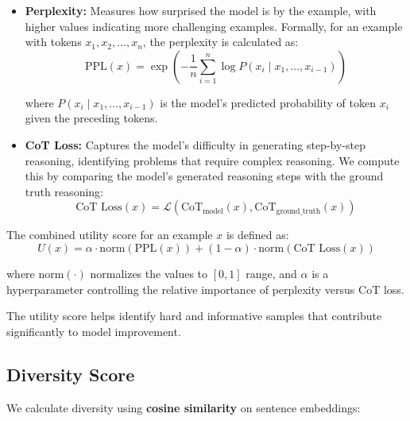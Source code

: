 \documentclass{article}
\begin{document}
\begin{itemize}
    \item \textbf{Perplexity:} Measures how surprised the model is by the example, with higher values indicating more challenging examples. Formally, for an example with tokens $x_1, x_2, \ldots, x_n$, the perplexity is calculated as:
    \begin{equation}\label{eq:5.1}
        \text{PPL}(x) = \exp\left(-\frac{1}{n} \sum_{i=1}^{n} \log P(x_i \mid x_1, \ldots, x_{i-1}) \right)
    \end{equation}
    
    where $P(x_i \mid x_1, \ldots, x_{i-1})$ is the model's predicted probability of token $x_i$ given the preceding tokens.
   
    \item \textbf{CoT Loss:} Captures the model's difficulty in generating step-by-step reasoning, identifying problems that require complex reasoning. We compute this by comparing the model's generated reasoning steps with the ground truth reasoning:
    \begin{equation}\label{eq:5.2}
    \text{CoT Loss}(x) = \mathcal{L}(\text{CoT}_{\text{model}}(x), \text{CoT}_{\text{ground\_truth}}(x))
    \end{equation}
\end{itemize}

The combined utility score for an example $x$ is defined as:
\begin{equation}\label{eq:5.3}
    U(x) = \alpha \cdot \text{norm}(\text{PPL}(x)) + (1 - \alpha) \cdot \text{norm}(\text{CoT Loss}(x))
\end{equation}

where $\text{norm}(\cdot)$ normalizes the values to $[0,1]$ range, and $\alpha$ is a hyperparameter controlling the relative importance of perplexity versus CoT loss.

The utility score helps identify hard and informative samples that contribute significantly to model improvement.

\subsection{Diversity Score}

We calculate diversity using \textbf{cosine similarity} on sentence embeddings:
\end{document}
